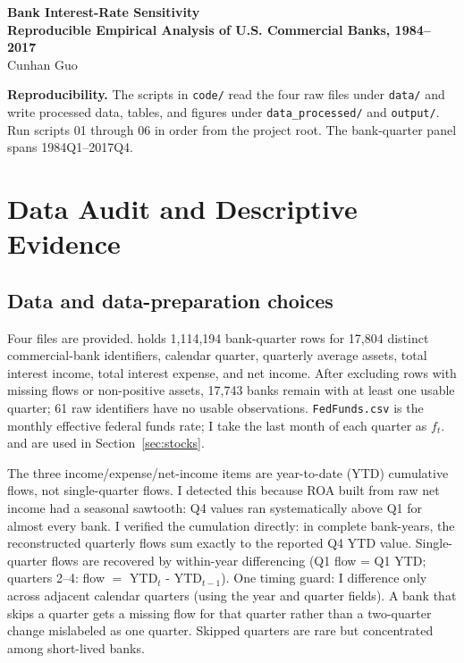 \documentclass[11pt]{article}
\begin{document}
\begin{center}
{\LARGE\bfseries Bank Interest-Rate Sensitivity\\[4pt]
\large Reproducible Empirical Analysis of U.S. Commercial Banks, 1984--2017}\\[10pt]
Cunhan Guo
\end{center}

\noindent\textbf{Reproducibility.} The scripts in \texttt{code/} read the four
raw files under \texttt{data/} and write processed data, tables, and figures
under \texttt{data\_processed/} and \texttt{output/}. Run scripts 01 through
06 in order from the project root. The bank-quarter panel spans
1984Q1--2017Q4.

\section{Data Audit and Descriptive Evidence}

\subsection{Data and data-preparation choices}
Four files are provided.  holds
1,114,194 bank-quarter rows for 17,804 distinct commercial-bank identifiers,
calendar quarter, quarterly average assets, total interest income, total
interest expense, and net income. After excluding rows with missing flows or
non-positive assets, 17,743 banks remain with at least one usable quarter;
61 raw identifiers have no usable observations. \texttt{FedFunds.csv} is the monthly
effective federal funds rate; I take the last month of each quarter as
$f_t$.  and
 are used in Section~\ref{sec:stocks}.

The three income/expense/net-income items are year-to-date (YTD) cumulative
flows, not single-quarter flows. I detected this because ROA built from raw
net income had a seasonal sawtooth: Q4 values ran systematically above Q1 for
almost every bank. I verified the cumulation directly: in complete bank-years,
the reconstructed quarterly flows sum exactly to the reported Q4 YTD value.
Single-quarter flows are recovered by within-year
differencing (Q1 flow = Q1 YTD; quarters 2--4: flow $=$ YTD$_t$ - YTD$_{t-1}$).
One timing guard: I difference only across adjacent calendar quarters (using
the year and quarter fields). A bank that skips a quarter gets a missing flow for that quarter
rather than a two-quarter change mislabeled as one quarter. Skipped quarters
are rare but concentrated among short-lived banks.
\end{document}
